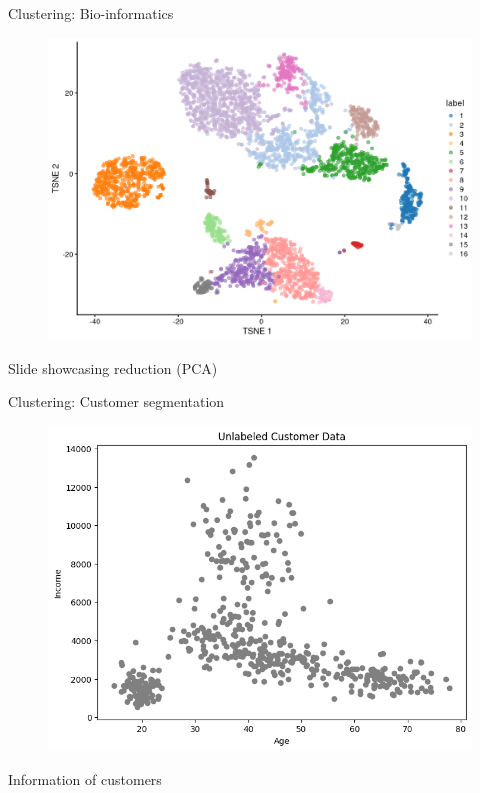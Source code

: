 \documentclass[serif, aspectratio=169]{beamer}
\begin{document}
\begin{frame}{Clustering: Bio-informatics}
    \begin{figure}
        \centering
        \includegraphics[scale=0.5]{pic/bioconductor_clustering.png}
    \end{figure}
\end{frame}

\begin{frame}{Slide showcasing reduction (PCA)}
    
\end{frame}

\begin{frame}{Clustering: Customer segmentation}
    \begin{figure}
        \centering
        \includegraphics[scale=0.45]{pic/customer_clusters_raw_plot.png}
    \end{figure}
    \begin{center}
        Information of customers
    \end{center}
\end{frame}
\end{document}
